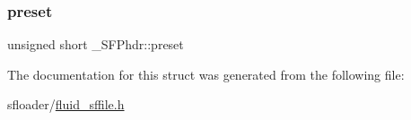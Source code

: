 \mbox{\label{struct__SFPhdr_aaa48440f19080bc8362e8c609fe2ec89}} 
\subsubsection{\texorpdfstring{preset}{preset}}
{\footnotesize\ttfamily unsigned short \+\_\+\+S\+F\+Phdr\+::preset}



The documentation for this struct was generated from the following file\+:\begin{DoxyCompactItemize}
\item 
sfloader/\hyperlink{fluid__sffile_8h}{fluid\+\_\+sffile.\+h}\end{DoxyCompactItemize}
